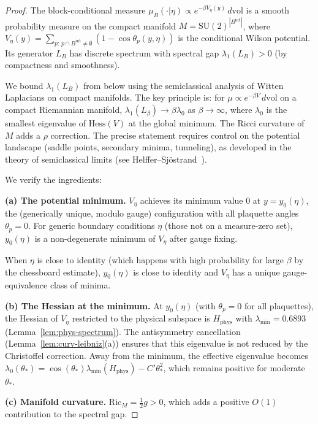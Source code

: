 \documentclass[11pt,a4paper]{article}
\theoremstyle{plain}
\theoremstyle{definition}
\theoremstyle{remark}
\newcommand{\SU}{\mathrm{SU}}
\newcommand{\Ric}{\mathrm{Ric}}
\newcommand{\Hess}{\mathrm{Hess}}
\begin{document}
\begin{proof}
The block-conditional measure $\mu_B(\cdot|\eta) \propto
e^{-\beta V_\eta(y)}\,d\mathrm{vol}$ is a smooth probability
measure on the compact manifold
$M = \SU(2)^{|B^{\mathrm{int}}|}$, where
$V_\eta(y) = \sum_{p:\,p \cap B^{\mathrm{int}} \neq \emptyset}
(1 - \cos\theta_p(y,\eta))$ is the conditional Wilson potential.
Its generator $L_B$ has discrete spectrum with spectral gap
$\lambda_1(L_B) > 0$ (by compactness and smoothness).

We bound $\lambda_1(L_B)$ from below using the semiclassical
analysis of Witten Laplacians on compact manifolds. The key
principle is: for $\mu \propto e^{-\beta V}\,d\mathrm{vol}$ on
a compact Riemannian manifold, $\lambda_1(L_\beta) \to \beta
\lambda_0$ as $\beta \to \infty$, where $\lambda_0$ is the
smallest eigenvalue of $\Hess(V)$ at the global minimum.
The Ricci curvature of $M$ adds a $\rho$ correction. The precise
statement requires control on the potential landscape (saddle
points, secondary minima, tunneling), as developed in the theory
of semiclassical limits (see Helffer--Sj\"ostrand~\cite{HelfferSjostrand1984}).

We verify the ingredients:

\textbf{(a) The potential minimum.}
$V_\eta$ achieves its minimum value $0$ at $y = y_0(\eta)$,
the (generically unique, modulo gauge) configuration with all
plaquette angles $\theta_p = 0$. For generic boundary conditions
$\eta$ (those not on a measure-zero set), $y_0(\eta)$ is a
non-degenerate minimum of $V_\eta$ after gauge fixing.

When $\eta$ is close to identity (which happens with high probability
for large $\beta$ by the chessboard estimate), $y_0(\eta)$ is
close to identity and $V_\eta$ has a unique gauge-equivalence class
of minima.

\textbf{(b) The Hessian at the minimum.}
At $y_0(\eta)$ (with $\theta_p = 0$ for all plaquettes), the Hessian
of $V_\eta$ restricted to the physical subspace is
$H_{\mathrm{phys}}$ with $\lambda_{\min} = 0.6893$
(Lemma~\ref{lem:phys-spectrum}). The antisymmetry cancellation
(Lemma~\ref{lem:curv-leibniz}(a)) ensures that this eigenvalue
is not reduced by the Christoffel correction. Away from the minimum,
the effective eigenvalue becomes
$\lambda_0(\theta_*) = \cos(\theta_*)\lambda_{\min}(H_\mathrm{phys})
- C'\theta_*^2$, which remains positive for moderate $\theta_*$.

\textbf{(c) Manifold curvature.}
$\Ric_M = \frac{1}{2}g > 0$, which adds a positive $O(1)$
contribution to the spectral gap.


\end{proof}
\end{document}
